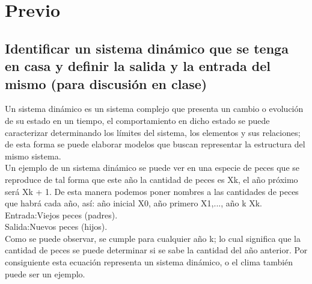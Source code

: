 \noindent \justifying

\section{Previo}

\subsection{Identificar un sistema dinámico que se tenga en casa y definir la salida y la entrada del mismo (para discusión en clase)}
Un sistema dinámico es un sistema complejo que presenta un cambio o evolución de su estado en un tiempo, el comportamiento en dicho estado se puede caracterizar determinando los límites del sistema, los elementos y sus relaciones; de esta forma se puede elaborar modelos que buscan representar la estructura del mismo sistema.\\
Un ejemplo de un sistema dinámico se puede ver en una especie de peces que se reproduce de tal forma que este año la cantidad de peces es Xk, el año próximo será Xk + 1. De esta manera podemos poner nombres a las cantidades de peces que habrá cada año, así: año inicial X0, año primero X1,..., año k Xk.\\
Entrada:Viejos peces (padres).\\
Salida:Nuevos peces (hijos).\\	
Como se puede observar, se cumple para cualquier año k; lo cual significa que la cantidad de peces se puede determinar si se sabe la cantidad del año anterior. Por consiguiente esta ecuación representa un sistema dinámico, o el clima también puede ser un ejemplo.\\


